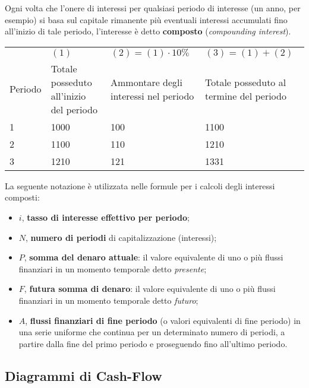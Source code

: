 \documentclass[a4paper,portrait,12pt]{article}
\theoremstyle{definition}
\begin{document}
Ogni volta che l'onere di interessi per qualsiasi periodo di interesse (un anno, per esempio) si basa sul capitale rimanente più eventuali interessi accumulati fino all'inizio di tale periodo, l'interesse è detto \textbf{composto} (\emph{compounding interest}).

\begin{table}
\begin{center}
\begin{tabular}{p{1.5cm}|p{3cm}p{3cm}p{3cm}}
\hline
& $(1)$ & $(2) = (1) \cdot 10\%$ & $(3) = (1) + (2)$ \\
Periodo & Totale posseduto all'inizio del periodo & Ammontare degli interessi nel periodo & Totale posseduto al termine del periodo\\
\hline
1 & 1000 & 100 & 1100\\
2 & 1100 & 110 & 1210\\
3 & 1210 & 121 & 1331\\
\hline
\end{tabular}
\end{center}
\end{table}

La seguente notazione è utilizzata nelle formule per i calcoli degli interessi composti:
\begin{itemize}
\item $i$, \textbf{tasso di interesse effettivo per periodo};
\item $N$, \textbf{numero di periodi} di capitalizzazione (interessi);
\item $P$, \textbf{somma del denaro attuale}: il valore equivalente di uno o più flussi finanziari in un momento temporale detto \emph{presente};
\item $F$, \textbf{futura somma di denaro}: il valore equivalente di uno o più flussi finanziari in un momento temporale detto \emph{futuro};
\item $A$, \textbf{flussi finanziari di fine periodo} (o valori equivalenti di fine periodo) in una serie uniforme che continua per un determinato numero di periodi, a partire dalla fine del primo periodo e proseguendo fino all'ultimo periodo.
\end{itemize}

\subsection{Diagrammi di Cash-Flow}
\end{document}
